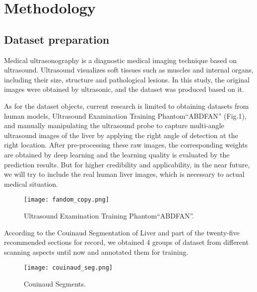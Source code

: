 \documentclass[12pt, a4paper]{article}
\begin{document}

\section{Methodology}

\subsection{Dataset preparation}

Medical ultrasonography is a diagnostic medical imaging technique based on ultrasound. Ultrasound visualizes soft tissues such as muscles and internal organs, including their size, structure and pathological lesions. In this study, the original images were obtained by ultrasonic, and the dataset was produced based on it.

As for the dataset objects, current research is limited to obtaining datasets from human models, Ultrasound Examination Training Phantom“ABDFAN”
(Fig.1), and manually manipulating the ultrasound probe to capture multi-angle ultrasound images of the liver by applying the right angle of detection at the right location. After pre-processing these raw images, the corresponding weights are obtained by deep learning and the learning quality is evaluated by the prediction results. But for higher credibility and applicability, in the near future, we will try to include the real human liver images, which is necessary to actual medical situation.

\begin{figure}
	\centering
	\texttt{[image: fandom\_copy.png]}
	\vspace*{-1mm}
	\caption{Ultrasound Examination Training Phantom“ABDFAN”.}
	\label{fig1}
\end{figure}

According to the Couinaud Segmentation of Liver and part of the twenty-five recommended sections for record\cite{4}, we obtained 4 groups of dataset from different scanning aspects until now and annotated them for training.

\begin{figure}[tbh]
	\centering
	\texttt{[image: couinaud\_seg.png]}
	\vspace*{-1mm}
	\caption{Couinaud Segments.}
	\label{fig: fig2}
\end{figure}
\end{document}

